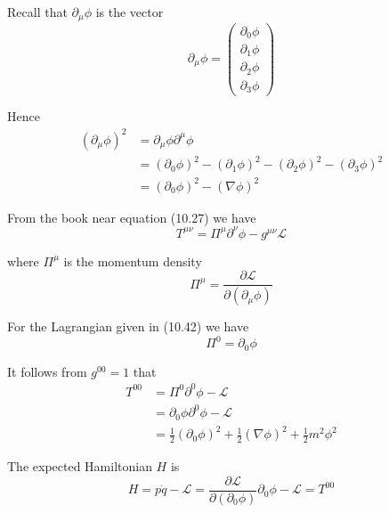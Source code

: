 


\bigskip
Recall that $\partial_\mu\phi$ is the vector
\begin{equation*}
\partial_\mu\phi=\begin{pmatrix}
\partial_0\phi
\\
\partial_1\phi
\\
\partial_2\phi
\\
\partial_3\phi
\end{pmatrix}
\end{equation*}

Hence
\begin{align*}
(\partial_\mu\phi)^2
&=\partial_\mu\phi\partial^\mu\phi
\\
&=(\partial_0\phi)^2-(\partial_1\phi)^2-(\partial_2\phi)^2-(\partial_3\phi)^2
\\
&=(\partial_0\phi)^2-(\nabla\phi)^2
\end{align*}

From the book near equation (10.27) we have
\begin{equation*}
T^{\mu\nu}=\Pi^\mu\partial^\nu\phi-g^{\mu\nu}\mathcal L
\end{equation*}

where $\Pi^\mu$ is the momentum density
\begin{equation*}
\Pi^\mu=\frac{\partial\mathcal L}{\partial(\partial_\mu\phi)}
\end{equation*}

For the Lagrangian given in (10.42) we have
\begin{equation*}
\Pi^0=\partial_0\phi
\end{equation*}

It follows from $g^{00}=1$ that
\begin{align*}
T^{00}
&=\Pi^0\partial^0\phi-\mathcal L
\\
&=\partial_0\phi\partial^0\phi-\mathcal L
\\
&=\frac{1}{2}(\partial_0\phi)^2+\frac{1}{2}(\nabla\phi)^2+\frac{1}{2}m^2\phi^2
\end{align*}

The expected Hamiltonian $H$ is
\begin{equation*}
H=p\dot q-\mathcal L
=\frac{\partial\mathcal L}{\partial(\partial_0\phi)}\partial_0\phi-\mathcal L
=T^{00}
\end{equation*}


